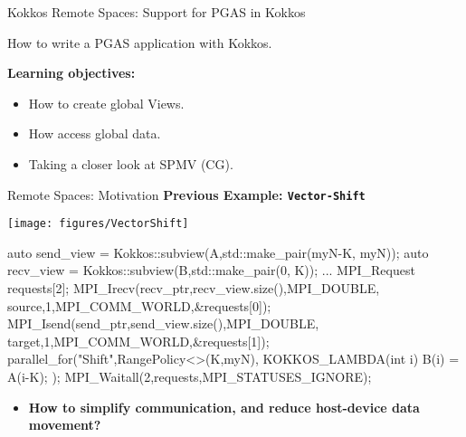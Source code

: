 
\begin{frame}[fragile]

  {\Huge Kokkos Remote Spaces: Support for PGAS in Kokkos}

  \vspace{10pt}

  {\large How to write a PGAS application with Kokkos.}

  \vspace{20pt}

  \textbf{Learning objectives:}
  \begin{itemize}
    \item {How to create global Views.}
    \item {How access global data.}
    \item {Taking a closer look at SPMV (CG).}
  \end{itemize}

  \vspace{-20pt}

\end{frame}



\begin{frame}[fragile]{Remote Spaces: Motivation}
  \textbf{Previous Example: \texttt{Vector-Shift}}
  \vspace{12pt}
  \center
  \begin{center}
  \texttt{[image: figures/VectorShift]}
  \end{center}
  \begin{code}[keywords={recv_ptr, send_ptr, send_view, recv_view,double,
  KOKKOS_LAMBDA,MPI_Irecv,MPI_Isend,parallel_for, MPI_Waitall}]
  auto send_view = Kokkos::subview(A,std::make_pair(myN-K, myN));
  auto recv_view = Kokkos::subview(B,std::make_pair(0, K));
  ...
  MPI_Request requests[2];
  MPI_Irecv(recv_ptr,recv_view.size(),MPI_DOUBLE,
            source,1,MPI_COMM_WORLD,&requests[0]);
  MPI_Isend(send_ptr,send_view.size(),MPI_DOUBLE,
            target,1,MPI_COMM_WORLD,&requests[1]);
  parallel_for("Shift",RangePolicy<>(K,myN), 
    KOKKOS_LAMBDA(int i) { B(i) = A(i-K); });
  MPI_Waitall(2,requests,MPI_STATUSES_IGNORE);
  \end{code}
  \begin{itemize}
    \item \textbf{How to simplify communication, and reduce host-device data movement?}
    \end{itemize}
\end{frame}

